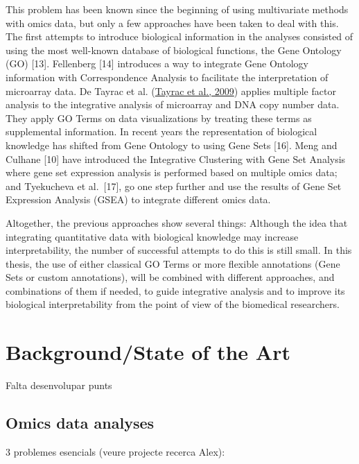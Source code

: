 \documentclass[a4paper, nobind]{templates/ociamthesis}
\begin{document}
This problem has been known since the beginning of using multivariate methods with omics data, but only a few approaches have been taken to deal with this. The first attempts to introduce biological information in the analyses consisted of using the most well-known database of biological functions, the Gene Ontology (GO) {[}13{]}. Fellenberg {[}14{]} introduces a way to integrate Gene Ontology information with Correspondence Analysis to facilitate the interpretation of microarray data. De Tayrac et al. (\protect\hyperlink{ref-de_tayrac_simultaneous_2009}{Tayrac et al., 2009}) applies multiple factor analysis to the integrative analysis of microarray and DNA copy number data. They apply GO Terms on data visualizations by treating these terms as supplemental information. In recent years the representation of biological knowledge has shifted from Gene Ontology to using Gene Sets {[}16{]}. Meng and Culhane {[}10{]} have introduced the Integrative Clustering with Gene Set Analysis where gene set expression analysis is performed based on multiple omics data; and Tyekucheva et al.~{[}17{]}, go one step further and use the results of Gene Set Expression Analysis (GSEA) to integrate different omics data.

Altogether, the previous approaches show several things: Although the idea that integrating quantitative data with biological knowledge may increase interpretability, the number of successful attempts to do this is still small. In this thesis, the use of either classical GO Terms or more flexible annotations (Gene Sets or custom annotations), will be combined with different approaches, and combinations of them if needed, to guide integrative analysis and to improve its biological interpretability from the point of view of the biomedical researchers.

\hypertarget{backgroundstate-of-the-art}{%
\section{Background/State of the Art}\label{backgroundstate-of-the-art}}

Falta desenvolupar punts

\hypertarget{omics-data-analyses}{%
\subsection{Omics data analyses}\label{omics-data-analyses}}

3 problemes esencials (veure projecte recerca Alex):
\end{document}
